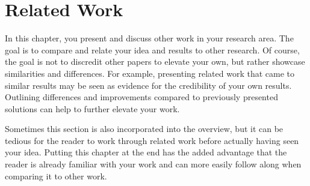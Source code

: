 \chapter{Related Work}
In this chapter, you present and discuss other work in your research area.
The goal is to compare and relate your idea and results to other research.
Of course, the goal is not to discredit other papers to elevate your own, but rather showcase similarities and differences.
For example, presenting related work that came to similar results may be seen as evidence for the credibility of your own results.
Outlining differences and improvements compared to previously presented solutions can help to further elevate your work.

Sometimes this section is also incorporated into the overview, but it can be tedious for the reader to work through related work before actually having seen your idea.
Putting this chapter at the end has the added advantage that the reader is already familiar with your work and can more easily follow along when comparing it to other work.

